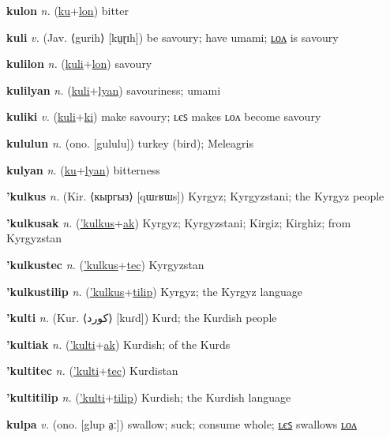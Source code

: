 \textbf{\hypertarget{kulon}{kulon}} \textit{n.} (\hyperlink{ku}{ku}+\allowbreak \hyperlink{lon}{lon})
bitter

\textbf{\hypertarget{kuli}{kuli}} \textit{v.} (Jav. ⟨gurih⟩ [kṳɽɪh])
be savoury; have umami; \hyperlink{kulilon}{ʟᴏᴧ} is savoury

\textbf{\hypertarget{kulilon}{kulilon}} \textit{n.} (\hyperlink{kuli}{kuli}+\allowbreak \hyperlink{lon}{lon})
savoury

\textbf{\hypertarget{kulilyan}{kulilyan}} \textit{n.} (\hyperlink{kuli}{kuli}+\allowbreak \hyperlink{lyan}{lyan})
savouriness; umami

\textbf{\hypertarget{kuliki}{kuliki}} \textit{v.} (\hyperlink{kuli}{kuli}+\allowbreak \hyperlink{ki}{ki})
make savoury; ʟєꜱ makes ʟᴏᴧ become savoury

\textbf{\hypertarget{kululun}{kululun}} \textit{n.} (ono. [gululu])
turkey (bird); Meleagris

\textbf{\hypertarget{kulyan}{kulyan}} \textit{n.} (\hyperlink{ku}{ku}+\allowbreak \hyperlink{lyan}{lyan})
bitterness

\textbf{\hypertarget{'kulkus}{'kulkus}} \textit{n.} (Kir. ⟨кыргыз⟩ [qɯrʁɯs])
Kyrgyz; Kyrgyzstani; the Kyrgyz people

\textbf{\hypertarget{'kulkusak}{'kulkusak}} \textit{n.} (\hyperlink{'kulkus}{'kulkus}+\allowbreak \hyperlink{ak}{ak})
Kyrgyz; Kyrgyzstani; Kirgiz; Kirghiz; from Kyrgyzstan

\textbf{\hypertarget{'kulkustec}{'kulkustec}} \textit{n.} (\hyperlink{'kulkus}{'kulkus}+\allowbreak \hyperlink{tec}{tec})
Kyrgyzstan

\textbf{\hypertarget{'kulkustilip}{'kulkustilip}} \textit{n.} (\hyperlink{'kulkus}{'kulkus}+\allowbreak \hyperlink{tilip}{tilip})
Kyrgyz; the Kyrgyz language

\textbf{\hypertarget{'kulti}{'kulti}} \textit{n.} (Kur. ⟨{\arabics{}کورد‎}⟩ [kuɾd])
Kurd; the Kurdish people

\textbf{\hypertarget{'kultiak}{'kultiak}} \textit{n.} (\hyperlink{'kulti}{'kulti}+\allowbreak \hyperlink{ak}{ak})
Kurdish; of the Kurds

\textbf{\hypertarget{'kultitec}{'kultitec}} \textit{n.} (\hyperlink{'kulti}{'kulti}+\allowbreak \hyperlink{tec}{tec})
Kurdistan

\textbf{\hypertarget{'kultitilip}{'kultitilip}} \textit{n.} (\hyperlink{'kulti}{'kulti}+\allowbreak \hyperlink{tilip}{tilip})
Kurdish; the Kurdish language

\textbf{\hypertarget{kulpa}{kulpa}} \textit{v.} (ono. [glup a̤ː])
swallow; suck; consume whole; \hyperlink{kulpales}{ʟєꜱ} swallows \hyperlink{kulpalon}{ʟᴏᴧ}

